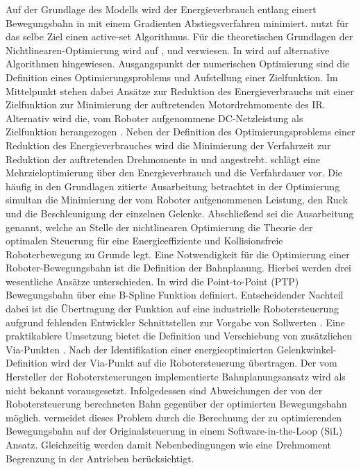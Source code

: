 %
%
Auf der Grundlage des Modells wird der Energieverbrauch entlang einert Bewegungsbahn in \Cite{Hansen.2012} mit einem Gradienten Abstiegsverfahren minimiert. \cite{Ziaukas.2017} nutzt für das selbe Ziel einen active-set Algorithmus. Für die theoretischen Grundlagen der Nichtlinearen-Optimierung wird auf \cite{Nocedal.2006}, \Cite{Papageorgiou.2015} und \cite{Luenberger.2021} verwiesen. In \cite[S.10~ff.]{Carabin.2017} wird auf alternative Algorithmen hingewiesen. Ausgangspunkt der numerischen Optimierung sind  die Definition eines Optimierungsproblems und Aufstellung einer Zielfunktion.  Im Mittelpunkt stehen dabei Ansätze zur Reduktion des Energieverbrauchs  \cite{Ziaukas.2017} mit einer Zielfunktion zur Minimierung der auftretenden Motordrehmomente des IR. Alternativ wird die, vom Roboter aufgenommene DC-Netzleistung als Zielfunktion herangezogen \cite{Hansen.2012}. Neben der Definition des Optimierungsproblems einer Reduktion des Energieverbrauches wird die Minimierung der Verfahrzeit zur Reduktion der auftretenden Drehmomente in \cite{Pellicciari.2011} und \cite{Ziaukas.2017} angestrebt. \cite{Lin.2018} schlägt eine Mehrzieloptimierung über den  Energieverbrauch und die Verfahrdauer vor. Die häufig in den Grundlagen zitierte Ausarbeitung \cite{Saravanan.2008} betrachtet in der Optimierung simultan die Minimierung der vom Roboter aufgenommenen Leistung, den Ruck  und die Beschleunigung der einzelnen Gelenke. Abschließend sei die Ausarbeitung  \cite{Bjorkenstam.2013} genannt, welche an Stelle der nichtlinearen Optimierung die Theorie der optimalen Steuerung für eine Energieeffiziente und Kollisionsfreie Roboterbewegung zu Grunde legt.
%
%
Eine Notwendigkeit für die Optimierung einer Roboter-Bewegungsbahn ist die Definition der Bahnplanung. Hierbei werden drei wesentliche Ansätze unterschieden. In \cite{Hansen.2012} wird die Point-to-Point (PTP) Bewegungsbahn über eine B-Spline Funktion definiert. Entscheidender Nachteil dabei ist die Übertragung der Funktion auf eine industrielle Robotersteuerung aufgrund fehlenden Entwickler Schnittstellen zur Vorgabe von Sollwerten \cite[S.~55~f.]{Eggers.2019}. Eine praktikablere Umsetzung bietet die Definition und Verschiebung von zusätzlichen Via-Punkten \cite[S.~261~ff.]{Spong.2020}. Nach der Identifikation einer energieoptimierten Gelenkwinkel-Definition wird der Via-Punkt auf die Robotersteuerung übertragen. Der vom Hersteller der Robotersteuerungen implementierte Bahnplanungsansatz wird als nicht bekannt vorausgesetzt. Infolgedessen sind Abweichungen der von der Robotersteuerung berechneten Bahn gegenüber der optimierten Bewegungsbahn möglich. \cite{Eggers.2019} vermeidet dieses Problem durch die Berechnung der zu optimierenden Bewegungsbahn auf der Originalsteuerung in einem Software-in-the-Loop (SiL) Ansatz. Gleichzeitig werden damit Nebenbedingungen wie eine Drehmoment Begrenzung in der Antrieben berücksichtigt. 
